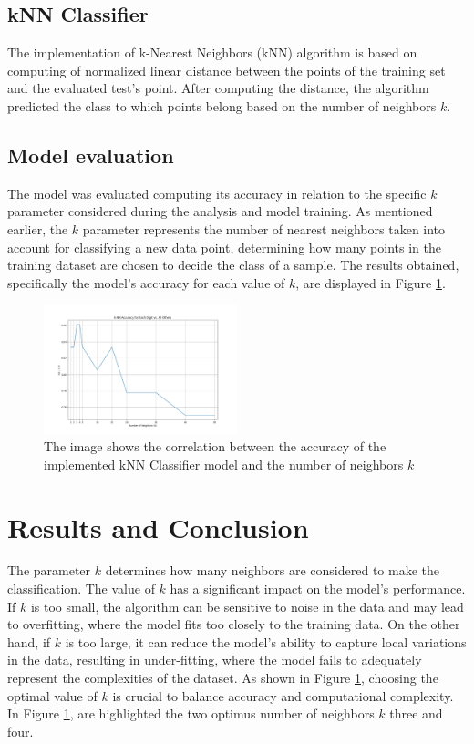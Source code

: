 \documentclass[9pt,technote]{IEEEtran}
\begin{document}
\subsection{kNN Classifier}
The implementation of k-Nearest Neighbors (kNN) algorithm is based on computing of normalized linear distance between the points of the training set and the evaluated test's point.
After computing the distance, the algorithm predicted the class to which points belong based on the number of neighbors $k$.

\subsection{Model evaluation}
The model was evaluated computing its accuracy in relation to the specific $k$ parameter considered during the analysis and model training. As mentioned earlier, the $k$ parameter represents the number of nearest neighbors taken into account for classifying a new data point, determining how many points in the training dataset are chosen to decide the class of a sample. The results obtained, specifically the model's accuracy for each value of $k$, are displayed in Figure \ref{fig::kNN_Classifier_Fig_accuracy}.
\begin{figure}[h]
	\centering
	\includegraphics[width=0.5\textwidth]{Figure_kNN_Classifier.png}
	\caption{The image shows the correlation between the accuracy of the implemented kNN Classifier model and the number of neighbors $k$}
	\label{fig::kNN_Classifier_Fig_accuracy}
\end{figure}

\section{Results and Conclusion}
The parameter $k$ determines how many neighbors are considered to make the classification. The value of $k$ has a significant impact on the model's performance. If $k$ is too small, the algorithm can be sensitive to noise in the data and may lead to overfitting, where the model fits too closely to the training data. On the other hand, if $k$ is too large, it can reduce the model's ability to capture local variations in the data, resulting in under-fitting, where the model fails to adequately represent the complexities of the dataset. As shown in Figure \ref{fig::kNN_Classifier_Fig_accuracy}, choosing the optimal value of $k$ is crucial to balance accuracy and computational complexity.
In Figure \ref{fig::kNN_Classifier_Fig_accuracy}, are highlighted the two optimus number of neighbors $k$ three and four.



\end{document}
